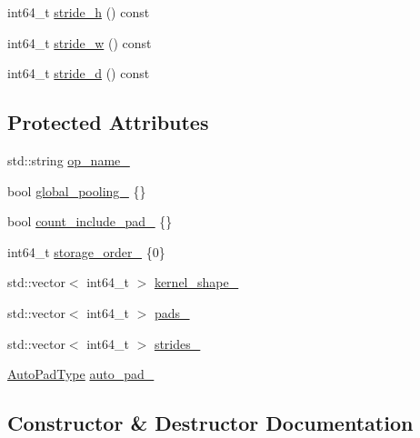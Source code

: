 \begin{DoxyCompactItemize}
\item 
int64\+\_\+t \mbox{\hyperlink{classonnxruntime_1_1PoolBase_a452467aa88e8573f8a4e26818891a200}{stride\+\_\+h}} () const
\item 
int64\+\_\+t \mbox{\hyperlink{classonnxruntime_1_1PoolBase_afd7e12a7ee1236f261419666a272c3c7}{stride\+\_\+w}} () const
\item 
int64\+\_\+t \mbox{\hyperlink{classonnxruntime_1_1PoolBase_a8d8411f6d6befd71f4ce0ae6a7bbfca0}{stride\+\_\+d}} () const
\end{DoxyCompactItemize}
\subsection*{Protected Attributes}
\begin{DoxyCompactItemize}
\item 
std\+::string \mbox{\hyperlink{classonnxruntime_1_1PoolBase_ac5d23d7b229dc2591f9c0d3c7f9aea47}{op\+\_\+name\+\_\+}}
\item 
bool \mbox{\hyperlink{classonnxruntime_1_1PoolBase_acac1af51d56763ea787e47aade8f32e0}{global\+\_\+pooling\+\_\+}} \{\}
\item 
bool \mbox{\hyperlink{classonnxruntime_1_1PoolBase_a05b454b7656653a2e62a48cc16db8cf2}{count\+\_\+include\+\_\+pad\+\_\+}} \{\}
\item 
int64\+\_\+t \mbox{\hyperlink{classonnxruntime_1_1PoolBase_a8c54de261d31ff7a10f2727759768906}{storage\+\_\+order\+\_\+}} \{0\}
\item 
std\+::vector$<$ int64\+\_\+t $>$ \mbox{\hyperlink{classonnxruntime_1_1PoolBase_ae5614fd2b239e5d9ce3701d4ec895eaa}{kernel\+\_\+shape\+\_\+}}
\item 
std\+::vector$<$ int64\+\_\+t $>$ \mbox{\hyperlink{classonnxruntime_1_1PoolBase_a97d82b98489070f0921c19b1811fdfab}{pads\+\_\+}}
\item 
std\+::vector$<$ int64\+\_\+t $>$ \mbox{\hyperlink{classonnxruntime_1_1PoolBase_a12246aa19006cba0dfb1fd125108bb91}{strides\+\_\+}}
\item 
\mbox{\hyperlink{namespaceonnxruntime_add1059a27d156d4ed3567a3a6852d94f}{Auto\+Pad\+Type}} \mbox{\hyperlink{classonnxruntime_1_1PoolBase_ab76a2f8a1212875d466684de7baa4a4b}{auto\+\_\+pad\+\_\+}}
\end{DoxyCompactItemize}


\subsection{Constructor \& Destructor Documentation}
\mbox{\label{classonnxruntime_1_1PoolBase_a5af935e3b9738fdb207395c9dae84c21}} 
